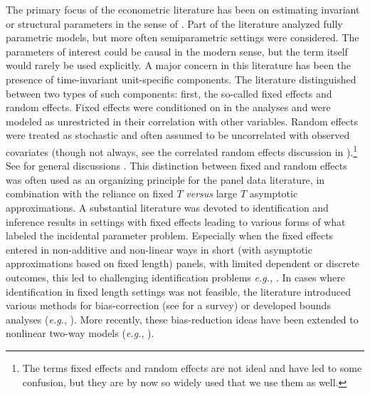 \documentclass[letterpaper,12pt,leqno]{article}
\begin{document}
The primary focus of the econometric literature has been on estimating invariant or structural parameters in the sense of \citep{goldberger1991course}. Part of the literature analyzed fully parametric models, but more often semiparametric settings were considered. The parameters of interest could be causal in the modern sense, but the term itself would rarely be used explicitly. A major concern in this literature has been the presence of time-invariant unit-specific components. The literature distinguished between two types of such components: first, the so-called fixed effects and random effects. Fixed effects were conditioned on in the analyses and were modeled as unrestricted in their correlation with other variables. Random 
effects  were treated as stochastic and often assumed to be uncorrelated with observed covariates (though not always, see the correlated random effects discussion in \citealp{chamberlain1984panel}).\footnote{The terms fixed effects and random effects are not ideal and have led to some confusion, but they are by now so widely used that we use them as well.} See for general discussions \citep{hsiao2022analysis, bell2015explaining}. This distinction between fixed and random effects was often used as an organizing principle for the panel data literature, in combination with the reliance on fixed $T$ {\it versus} large $T$ asymptotic approximations. A substantial literature was devoted to identification and inference results in settings with fixed effects leading to various forms of what \citep{neyman1948consistent} labeled the incidental parameter problem. Especially when the fixed effects entered in non-additive and non-linear ways in short (with asymptotic approximations based on fixed length) panels, with limited dependent or discrete outcomes, this led to challenging identification problems {\it e.g.,} \citep{chamberlain1980analysis, honore1992trimmed, magnac2004panel, bonhomme2012functional}. In cases where identification in fixed length settings was not feasible, the literature introduced various methods for bias-correction  (see \citep{arellano2007understanding} for a survey) or developed bounds analyses ({\it e.g.}, \citep{honore2006bounds}). More recently, these bias-reduction ideas have been extended to nonlinear two-way models ({\it e.g.}, \citealp{fernandez2016individual,fernandez2018fixed}).
\end{document}
